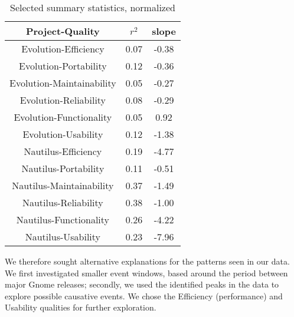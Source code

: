 \documentclass[conference, compsoc]{IEEEtran}
\begin{document}
\begin{table}
	\caption{Selected summary statistics, normalized}
	\centering
	\label{tbl:summary}
\begin{tabular}{|c|c|c|}
\hline
\rowcolor[gray]{.9} 
Project-Quality &  $r^2$ &  slope \\ \hline
Evolution-Efficiency & 0.07 & -0.38 \\
Evolution-Portability & 0.12 & -0.36 \\
Evolution-Maintainability & 0.05 & -0.27 \\
Evolution-Reliability & 0.08 & -0.29 \\
Evolution-Functionality & 0.05 & 0.92 \\
Evolution-Usability & 0.12 & -1.38 \\
Nautilus-Efficiency & 0.19 & -4.77 \\
Nautilus-Portability & 0.11 & -0.51 \\
Nautilus-Maintainability & 0.37 & -1.49 \\
Nautilus-Reliability & 0.38 & -1.00 \\
Nautilus-Functionality & 0.26 & -4.22 \\
Nautilus-Usability & 0.23 & -7.96 \\
\hline
\end{tabular}
\end{table}

We therefore sought alternative explanations for the patterns seen in our data. We first investigated smaller event windows, based around the period between major Gnome releases; secondly, we used the identified peaks in the data to explore possible causative events. We chose the Efficiency (performance) and Usability qualities for further exploration.
\end{document}
